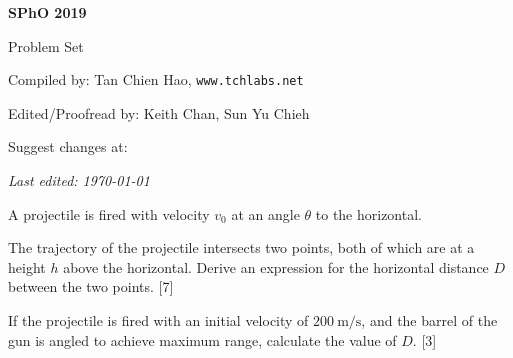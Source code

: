 \def\sphoyear{2019}
\setcounter{section}{0}
\fancyhead[L]{\textbf{SPhO \sphoyear}} 


\begin{titlepage}
\centering

{\Huge\bfseries SPhO \sphoyear}

\vspace{1cm}

{\LARGE Problem Set}

\vspace{2cm}

{\Large Compiled by: Tan Chien Hao, \texttt{www.tchlabs.net}}

\vspace{2cm}

{\Large Edited/Proofread by: Keith Chan, Sun Yu Chieh}

\vspace{2cm}

{\large Suggest changes at: \github}


\vfill

{\itshape Last edited: \today}
\end{titlepage}


\begin{problem}
    A projectile is fired with velocity $v_{0}$ at an angle $\theta$ to the horizontal.
    \begin{subproblem}
    The trajectory of the projectile intersects two points, both of which are at a height $h$ above the horizontal. Derive an expression for the horizontal distance $D$ between the two points.
    \hfill{[7]}\end{subproblem}
    \begin{subproblem}
    If the projectile is fired with an initial velocity of $\qty{200}{\m\per\s}$, and the barrel of the gun is angled to achieve maximum range, calculate the value of $D$.
    \hfill{[3]}\end{subproblem}
\end{problem}

